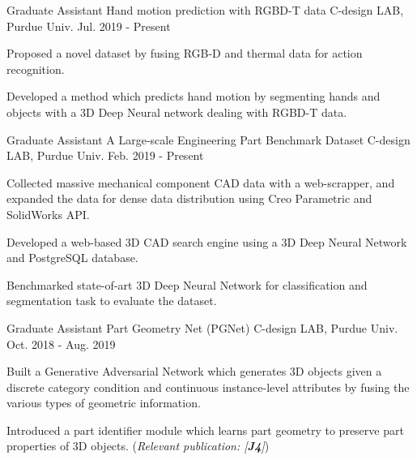 


\begin{cventries}
\cventry
{Graduate Assistant} %
{Hand motion prediction with RGBD-T data} %
{C-design LAB, Purdue Univ.} %
{Jul. 2019 - Present} %
{ %
\begin{cvitems}
\item {Proposed a novel dataset by fusing RGB-D and thermal data for action recognition.}
\item {Developed a method which predicts hand motion by segmenting hands and objects with a 3D Deep Neural network dealing with RGBD-T data.}
\end{cvitems}
}


\cventry
{Graduate Assistant} %
{A Large-scale Engineering Part Benchmark Dataset} %
{C-design LAB, Purdue Univ.} %
{Feb. 2019 - Present} %
{ %
\begin{cvitems}
\item {Collected massive mechanical component CAD data with a web-scrapper, and expanded the data for dense data distribution using Creo Parametric and SolidWorks API.}
\item {Developed a web-based 3D CAD search engine using a 3D Deep Neural Network and PostgreSQL database.}
\item {Benchmarked state-of-art 3D Deep Neural Network for classification and segmentation task to evaluate the dataset.}
\end{cvitems}
}


\cventry
{Graduate Assistant} %
{Part Geometry Net (PGNet)} %
{C-design LAB, Purdue Univ.} %
{Oct. 2018 - Aug. 2019} %
{ %
\begin{cvitems}
\item {Built a Generative Adversarial Network which generates 3D objects given a discrete category condition and continuous instance-level attributes by fusing the various types of geometric information.}
\item {Introduced a part identifier module which learns part geometry to preserve part properties of 3D objects. (\textit{Relevant publication: [\textbf{J4}]})}
\end{cvitems}
}


\end{cventries}
